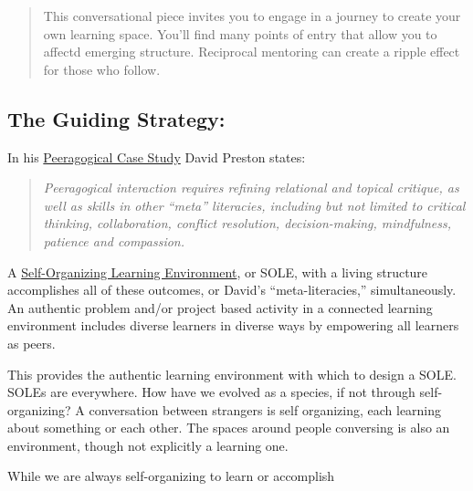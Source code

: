 \begin{quote}
This conversational piece invites you to engage in a journey to create
your own learning space. You'll find many points of entry that allow you
to affectd emerging structure. Reciprocal mentoring can create a ripple
effect for those who follow.
\end{quote}

\subsection{The Guiding Strategy:}\label{the-guiding-strategy}

In his \href{http://peeragogy.org/case-study-5ph1nx/}{Peeragogical Case
Study} David Preston states:

\begin{quote}
\emph{Peeragogical interaction requires refining relational and topical
critique, as well as skills in other ``meta'' literacies, including but
not limited to critical thinking, collaboration, conflict resolution,
decision-making, mindfulness, patience and compassion.}
\end{quote}

A
\href{http://en.wikipedia.org/wiki/Self_Organised_Learning_Environment}{Self-Organizing
Learning Environment}, or SOLE, with a living structure accomplishes all
of these outcomes, or David's ``meta-literacies,'' simultaneously. An
authentic problem and/or project based activity in a connected learning
environment includes diverse learners in diverse ways by empowering all
learners as peers.

This provides the authentic learning environment with which to design a
SOLE. SOLEs are everywhere. How have we evolved as a species, if not
through self-organizing? A conversation between strangers is self
organizing, each learning about something or each other. The spaces
around people conversing is also an environment, though not explicitly a
learning one. 

While we are always self-organizing to learn or accomplish

